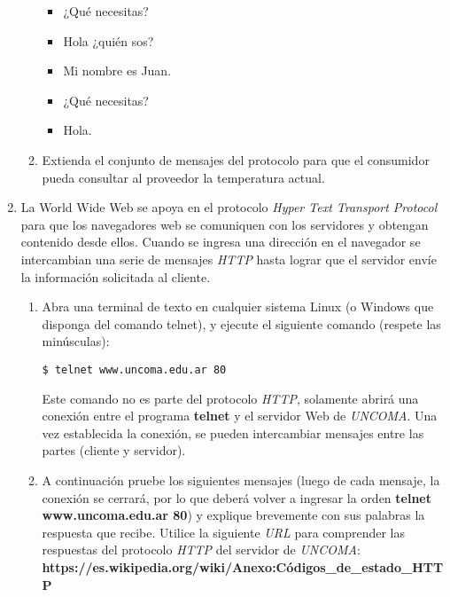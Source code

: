 \documentclass[12pt]{article}
\begin{document}
\begin{enumerate}
\begin{enumerate}
\begin{itemize}
            \item ¿Qué necesitas?

            \item Hola ¿quién sos?

            \item Mi nombre es Juan.

            \item ¿Qué necesitas?

            \item Hola.

        \end{itemize}

        \item Extienda el conjunto de mensajes del protocolo para que el
consumidor pueda consultar al proveedor la temperatura actual.

    \end{enumerate}

    \item La World Wide Web se apoya en el protocolo \emph{Hyper Text
        Transport Protocol} para que los navegadores web se comuniquen con los
        servidores y obtengan contenido desde ellos. Cuando se ingresa una
        dirección en el navegador se intercambian una serie de mensajes
        \emph{HTTP} hasta lograr que el servidor envíe la información
        solicitada al cliente.

    \begin{enumerate}

    \item Abra una terminal de texto en cualquier sistema Linux (o Windows que
        disponga del comando telnet), y ejecute el siguiente comando (respete
            las minúsculas):

            \begin{verbatim}
$ telnet www.uncoma.edu.ar 80
            \end{verbatim}

            Este comando no es parte del protocolo \emph{HTTP}, solamente
            abrirá una conexión entre el programa \textbf{telnet} y el
            servidor Web de \emph{UNCOMA}. Una vez establecida la conexión, se
            pueden intercambiar mensajes entre las partes (cliente y
            servidor).

    \item A continuación pruebe los siguientes mensajes (luego de cada
        mensaje, la conexión se cerrará, por lo que deberá volver a ingresar
            la orden \textbf{telnet www.uncoma.edu.ar 80}) y explique
            brevemente con sus palabras la respuesta que recibe. Utilice la
            siguiente \emph{URL} para comprender las respuestas del protocolo
            \emph{HTTP} del servidor de \emph{UNCOMA}:
            \textbf{https://es.wikipedia.org/wiki/Anexo:C\'odigos\_de\_estado\_HTTP}


\end{enumerate}
\end{enumerate}
\end{document}
